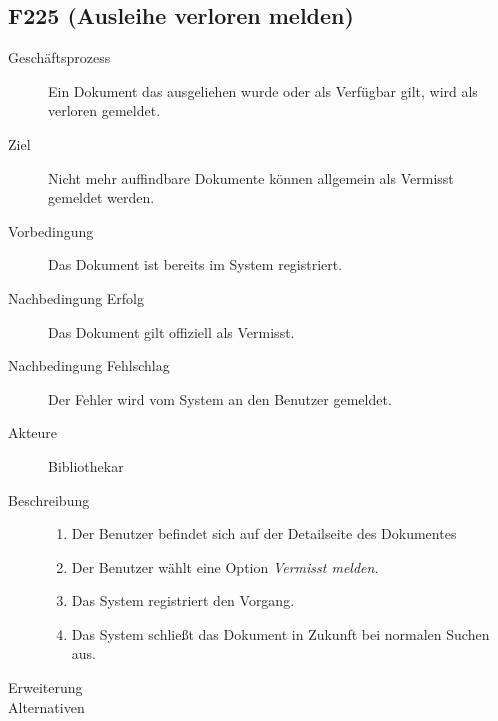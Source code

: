 \subsection{F225 (Ausleihe verloren melden)}
\label{F:AusleiheVerlohren}
\begin{description}
  \item[Geschäftsprozess]Ein Dokument das ausgeliehen wurde oder als Verfügbar gilt, wird als verloren gemeldet.
  \item[Ziel]Nicht mehr auffindbare Dokumente können allgemein als Vermisst gemeldet werden.
  \item[Vorbedingung]Das Dokument ist bereits im System registriert.
  \item[Nachbedingung Erfolg]Das Dokument gilt offiziell als Vermisst.
  \item[Nachbedingung Fehlschlag]Der Fehler wird vom System an den Benutzer gemeldet.
  \item[Akteure]Bibliothekar
  \item[Beschreibung]\hfill
    \begin{enumerate}
      \item Der Benutzer befindet sich auf der Detailseite des Dokumentes
      \item Der Benutzer wählt eine Option \emph{Vermisst melden}.
      \item Das System registriert den Vorgang.
      \item Das System schließt das Dokument in Zukunft bei normalen Suchen aus.
    \end{enumerate}
  \item[Erweiterung]\hfill
  \item[Alternativen]
\end{description}


